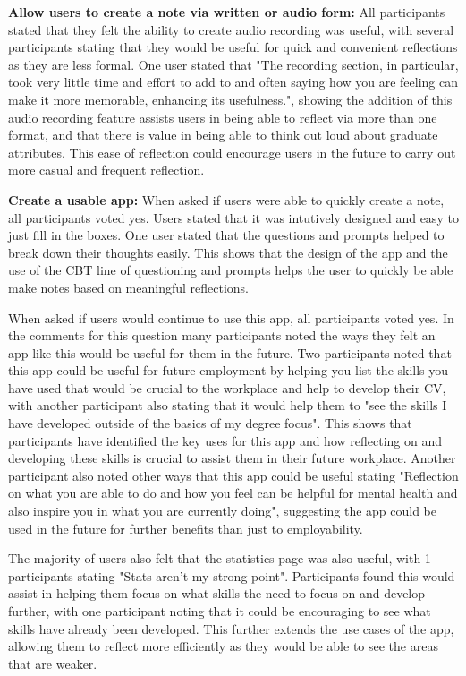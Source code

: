 \documentclass{l4proj}
\begin{document}
\textbf{Allow users to create a note via written or audio form:} All participants stated that they felt the ability to create audio recording was useful, with several participants stating that they would be useful for quick and convenient reflections as they are less formal. One user stated that "The recording section, in particular, took very little time and effort to add to and often saying how you are feeling can make it more memorable, enhancing its usefulness.", showing the addition of this audio recording feature assists users in being able to reflect via more than one format, and that there is value in being able to think out loud about graduate attributes. This ease of reflection could encourage users in the future to carry out more casual and frequent reflection. 

\textbf{Create a usable app:} When asked if users were able to quickly create a note, all participants voted yes. Users stated that it was intutively designed and easy to just fill in the boxes. One user stated that the questions and prompts helped to break down their thoughts easily. This shows that the design of the app and the use of the CBT line of questioning and prompts helps the user to quickly be able make notes based on meaningful reflections. 

When asked if users would continue to use this app, all participants voted yes. In the comments for this question many participants noted the ways they felt an app like this would be useful for them in the future. Two participants noted that this app could be useful for future employment by helping you list the skills you have used that would be crucial to the workplace and help to develop their CV, with another participant also stating that it would help them to "see the skills I have developed outside of the basics of my degree focus". This shows that participants have identified the key uses for this app and how reflecting on and developing these skills is crucial to assist them in their future workplace. Another participant also noted other ways that this app could be useful stating "Reflection on what you are able to do and how you feel can be helpful for mental health and also inspire you in what you are currently doing", suggesting the app could be used in the future for further benefits than just to employability.
 
The majority of users also felt that the statistics page was also useful, with 1 participants stating "Stats aren't my strong point". Participants found this would assist in helping them focus on what skills the need to focus on and develop further, with one participant noting that it could be encouraging to see what skills have already been developed. This further extends the use cases of the app, allowing them to reflect more efficiently as they would be able to see the areas that are weaker. 
\end{document}
